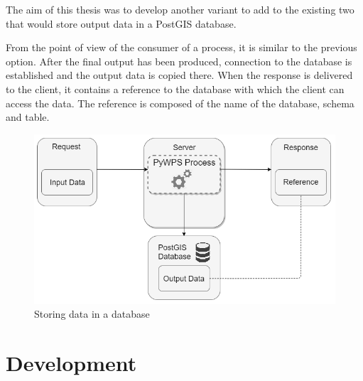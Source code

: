 The aim of this thesis was to develop another variant to add to the
existing two that would store output data in a PostGIS database.

From the point of view of the consumer of a process, it is similar to
the previous option. After the final output has been produced,
connection to the database is established and the output data is
copied there. When the  response is delivered to the client,
it contains a reference to the database with which the client can
access the data. The reference is composed of the name of the
database, schema and table.


\begin{figure}[H] \centering
  \includegraphics[width=350pt]{./pictures/newoption.png}
      \caption[Storing data in a database]{Storing data in a database}
      \label{fig:newoption}
  \end{figure}




\section{Development} 

